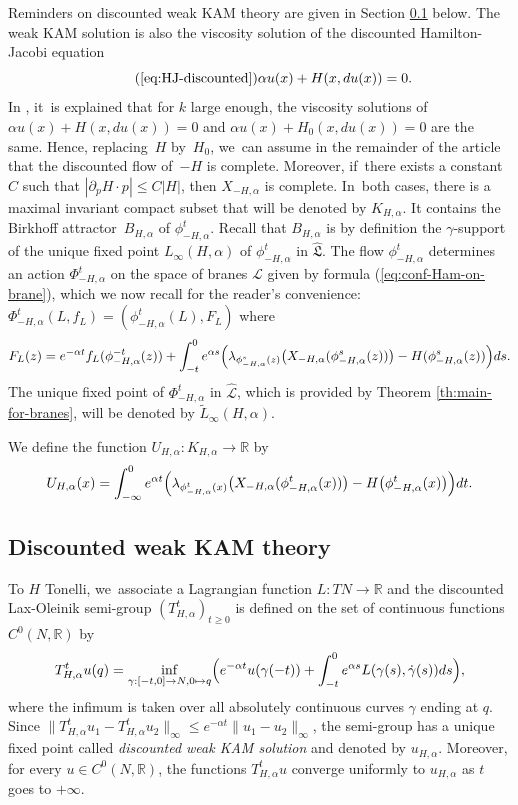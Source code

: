 \documentclass[10pt]{amsart}
\newcommand\mto{\mathchoice{\longmapsto}{\mapsto}{\mapsto}{\mapsto}}
\theoremstyle{definition}
\newcommand {\LL}{{\mathcal L}}
\newcommand{\R}{\mathbb{R}}
\newcommand{\fL}{\mathfrak {L}}
\newcommand{\hatL}{\widehat{\fL}}
\newcommand{\hatLL}{\widehat{\LL}}
\begin{document}
Reminders on discounted weak KAM theory are given in Section \ref{sec:Discounted-weak-KAM-theory} below. The weak KAM solution is also the viscosity solution of the discounted Hamilton-Jacobi equation\vspace*{-3pt}
\[
\tag{\ref{eq:HJ-discounted}}
\alpha u(x) + H(x,du(x))=0.
\]
In \cite[p.\,38]{DFIZ}, it~is explained that for $k$ large enough, the viscosity solutions of $\alpha u(x) + H(x,du(x))=0$ and $\alpha u(x) + H_0(x,du(x))=0 $ are the same. Hence, replacing~$H$ by~$H_0$, we~can assume in the remainder of the article that the discounted flow of~$-H$ is complete.
Moreover, if~there exists a constant $C$ such that \hbox{$|\partial_pH\cdot p|\leq C|H|$}, then $X_{-H, \alpha}$ is complete. In~both cases, there is a maximal invariant compact subset that will be denoted by $K_{H, \alpha}$. It contains the Birkhoff attractor~$B_{H, \alpha}$ of $\phi_{-H,\alpha}^t$. Recall that $B_{H,\alpha}$ is by definition the $\gamma$\nobreakdash-support of the unique fixed point $L_\infty(H, \alpha)$ of $\phi_{-H,\alpha}^t$ in $\hatL$. The flow $\phi_{-H,\alpha}^t$ determines an action $\Phi_{-H,\alpha}^t$ on the space of branes $\LL$ given by formula (\ref{eq:conf-Ham-on-brane}), which we now recall for the reader's convenience: $\Phi^t_{-H, \alpha}(L, f_L)=(\phi^t_{-H, \alpha}(L), F_L)$
where
\[
F_L(z)=e^{-\alpha t}f_L(\phi^{-t}_{-H, \alpha}(z))+\int_{-t}^0e^{\alpha s}\Bigl(\lambda_{\phi^s_{-H, \alpha}(z)}\bigl(X_{-H, \alpha}(\phi_{-H, \alpha}^s(z))\bigr)-H(\phi^s_{-H, \alpha}(z))\Bigr)ds.
\]
The unique fixed point of $\Phi_{-H,\alpha}^t$ in $\hatLL$, which is provided by Theorem \ref{th:main-for-branes}, will be denoted by $\tilde L_\infty(H, \alpha)$.

We define the function $U_{H, \alpha}:K_{H, \alpha}\to \R$ by
\[
U_{H, \alpha}(x)=\int_{-\infty}^0 e^{\alpha t}\Bigl(\lambda_{\phi_{-H, \alpha}^t(x)}\bigl(X_{-H, \alpha}(\phi_{-H, \alpha}^t(x))\bigr)-H\bigl(\phi_{-H, \alpha}^t(x)\bigr)\Bigr)dt.
\]

\subsection{Discounted weak KAM theory}\label{sec:Discounted-weak-KAM-theory}

To $H$ Tonelli, we~associate a Lagrangian function $L:TN\to\R$ and
the discounted Lax-Oleinik semi-group $(T_{H, \alpha}^t)_{t\geq 0}$ is defined on the set of continuous functions $C^0(N, \R)$ by
\begin{equation} \label{eq:DLO-semi-group} T_{H, \alpha}^tu(q)=\inf_{\gamma:[-t, 0]\to N, 0\mto q} \Bigl(e^{-\alpha t}u(\gamma(-t))+\int_{-t}^0 e^{\alpha s} L(\gamma (s), \dot \gamma (s)) ds\Bigr) ,\end{equation}
where
the infimum is taken over all absolutely continuous curves $\gamma$ ending at $q$. Since $\|T^t_{H, \alpha}u_1-T^t_{H, \alpha}u_2\|_\infty\leq e^{-\alpha t}\| u_1-u_2\|_\infty$, the semi-group has a unique fixed point called \emph{discounted weak KAM solution} and denoted by $u_{H, \alpha}$. Moreover, for every $u\in C^0(N, \R)$, the functions $T_{H, \alpha}^tu$ converge uniformly to $u_{H, \alpha}$ as $t$ goes to $+\infty$.
\end{document}
